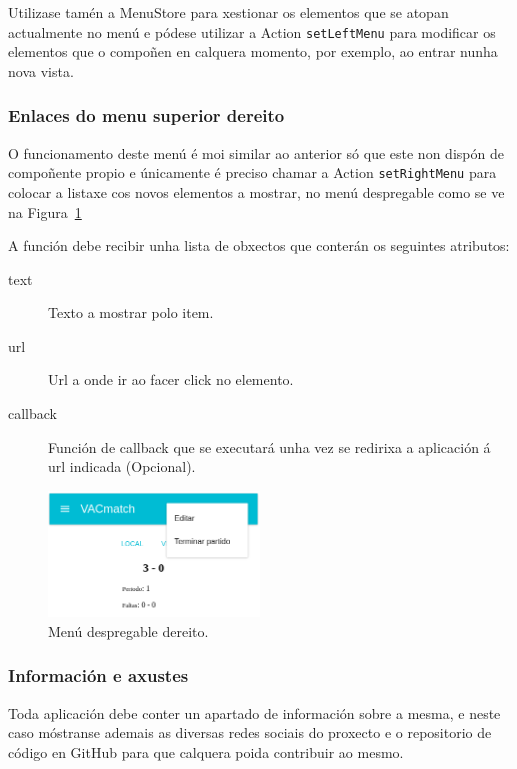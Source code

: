       Utilizase tamén a MenuStore para xestionar os elementos que 
se atopan actualmente no menú e pódese utilizar a Action 
\lstinline{setLeftMenu} para modificar os elementos que o compoñen en calquera 
momento, por exemplo, ao 
entrar nunha nova vista.

      \subsubsection{Enlaces do menu superior dereito}
      O funcionamento deste menú é moi similar ao anterior só que este 
non dispón de compoñente propio e únicamente é preciso chamar a Action 
\lstinline{setRightMenu} para colocar a listaxe cos novos elementos a mostrar, 
no menú despregable como se ve na Figura~\ref{fig:design:rightmenu}

      A función debe recibir unha lista de obxectos que conterán os 
seguintes atributos:

      \begin{description}
       \item [text] Texto a mostrar polo item.
       \item [url] Url a onde ir ao facer click no elemento.
       \item [callback] Función de callback que se executará unha vez se 
redirixa a aplicación á url indicada (Opcional).
      \end{description}

      \begin{figure}[h!]
        \begin{center}
        \includegraphics[width=0.5\textwidth]{./img/demo/2_right_menu.png}
        \caption{Menú despregable dereito.}
        \label{fig:design:rightmenu}
        \end{center}
      \end{figure}


      \subsubsection{Información e axustes}
      Toda aplicación debe conter un apartado de información sobre a mesma, e 
neste caso móstranse ademais as diversas redes sociais do proxecto e o 
repositorio de código en GitHub para que calquera poida contribuir ao mesmo.

